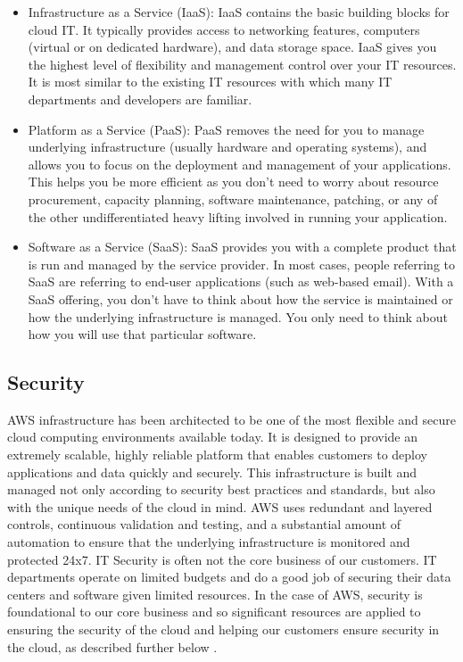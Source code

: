 \begin{itemize}
    \item Infrastructure as a Service (IaaS): IaaS contains the basic building blocks for cloud IT. It typically provides access to networking features, computers (virtual or on dedicated hardware), and data storage space. IaaS gives you the highest level of flexibility and management control over your IT resources. It is most similar to the existing IT resources with which many IT departments and developers are familiar. 
    \item Platform as a Service (PaaS): PaaS removes the need for you to manage underlying infrastructure (usually hardware and operating systems), and allows you to focus on the deployment and management of your applications. This helps you be more efficient as you don't need to worry about resource procurement, capacity planning, software maintenance, patching, or any of the other undifferentiated heavy lifting involved in running your application. 
    \item Software as a Service (SaaS): SaaS provides you with a complete product that is run and managed by the service provider. In most cases, people referring to SaaS are referring to end-user applications (such as web-based email). With a SaaS offering, you don't have to think about how the service is maintained or how the underlying infrastructure is managed. You only need to think about how you will use that particular software.
\end{itemize}

\subsection{Security}
AWS infrastructure has been architected to be one of the most flexible and secure cloud computing environments available today. It is designed to provide an extremely scalable, highly reliable platform that enables customers to deploy applications and data quickly and securely. This infrastructure is built and managed not only according to security best practices and standards, but also with the unique needs of the cloud in mind. AWS uses redundant and layered controls, continuous validation and testing, and a substantial amount of automation to ensure that the underlying infrastructure is monitored and protected 24x7. IT Security is often not the core business of our customers. IT departments operate on limited budgets and do a good job of securing their data centers and software given limited resources. In the case of AWS, security is foundational to our core business and so significant resources are applied to ensuring the security of the cloud and helping our customers ensure security in the cloud, as described further below \cite{AWSCloudComputing}. 

